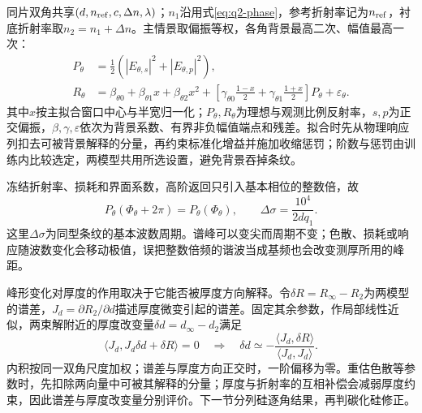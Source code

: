 同片双角共享$(d,n_{\rm ref},c,\Delta n,\lambda)$；$n_1$沿用式\eqref{eq:q2-phase}，参考折射率记为$n_{\rm ref}$，衬底折射率取$n_2=n_1+\Delta n$。主情景取偏振等权，各角背景最高二次、幅值最高一次：
\begin{equation}
\begin{aligned}
P_\theta&=\tfrac12\left(|E_{\theta,s}|^2+|E_{\theta,p}|^2\right),\\
R_\theta&=\beta_{\theta0}+\beta_{\theta1}x+\beta_{\theta2}x^2+
\left[\gamma_{\theta0}\frac{1-x}{2}+\gamma_{\theta1}\frac{1+x}{2}\right]P_\theta+\varepsilon_\theta.
\end{aligned}
\label{eq:q3-observation}
\end{equation}
其中$x$按主拟合窗口中心与半宽归一化；$P_\theta,R_\theta$为理想与观测比例反射率，$s,p$为正交偏振，$\beta,\gamma,\varepsilon$依次为背景系数、有界非负幅值端点和残差。拟合时先从物理响应列扣去可被背景解释的分量，再约束标准化增益并施加收缩惩罚；阶数与惩罚由训练内比较选定，两模型共用所选设置，避免背景吞掉条纹。

冻结折射率、损耗和界面系数，高阶返回只引入基本相位的整数倍，故
\begin{equation}
P_\theta(\Phi_\theta+2\pi)=P_\theta(\Phi_\theta),\qquad
\Delta\sigma=\frac{10^4}{2dq_1}.
\label{eq:q3-period}
\end{equation}
这里$\Delta\sigma$为同型条纹的基本波数周期。谱峰可以变尖而周期不变；色散、损耗或响应随波数变化会移动极值，误把整数倍频的谐波当成基频也会改变测厚所用的峰距。

峰形变化对厚度的作用取决于它能否被厚度方向解释。令$\delta R=R_\infty-R_2$为两模型的谱差，$J_d=\partial R_2/\partial d$描述厚度微变引起的谱差。固定其余参数，作局部线性近似，两束解附近的厚度改变量$\delta d=d_\infty-d_2$满足
\begin{equation}
\langle J_d,J_d\delta d+\delta R\rangle=0
\quad\Longrightarrow\quad
\delta d\simeq-\frac{\langle J_d,\delta R\rangle}{\langle J_d,J_d\rangle}.
\label{eq:q3-thickness-shift}
\end{equation}
内积按同一双角尺度加权；谱差与厚度方向正交时，一阶偏移为零。重估色散等参数时，先扣除两向量中可被其解释的分量；厚度与折射率的互相补偿会减弱厚度约束，因此谱差与厚度改变量分别评价。下一节分列硅逐角结果，再判碳化硅修正。

\endgroup
